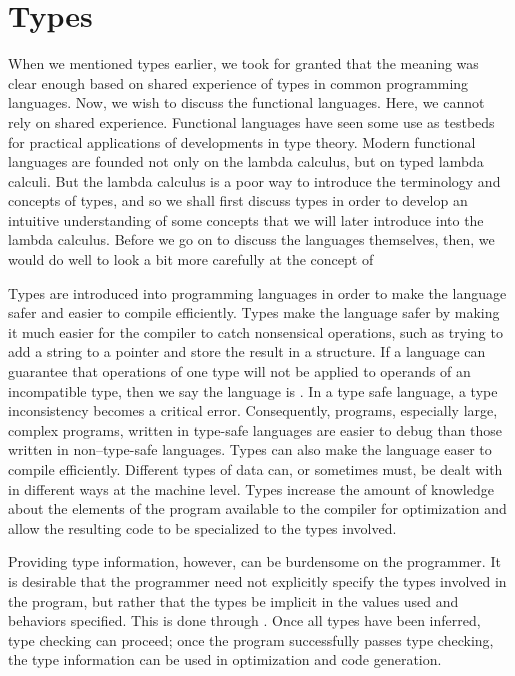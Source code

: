 \section{Types}
When we mentioned types earlier, we took for granted that the meaning was clear enough based on shared experience of types in common programming languages. Now, we wish to discuss the functional languages. Here, we cannot rely on shared experience. Functional languages have seen some use as testbeds for practical applications of developments in type theory. Modern functional languages are founded not only on the lambda calculus, but on typed lambda calculi. But the lambda calculus is a poor way to introduce the terminology and concepts of types, and so we shall first discuss types in order to develop an intuitive understanding of some concepts that we will later introduce into the lambda calculus. Before we go on to discuss the languages themselves, then, we would do well to look a bit more carefully at the concept of 

Types are introduced into programming languages in order to make the language safer and easier to compile efficiently. Types make the language safer by making it much easier for the compiler to catch nonsensical operations, such as trying to add a string to a pointer and store the result in a structure. If a language can guarantee that operations of one type will not be applied to operands of an incompatible type, then we say the language is . In a type safe language, a type inconsistency becomes a critical error. Consequently, programs, especially large, complex programs, written in type-safe languages are easier to debug than those written in non--type-safe languages. Types can also make the language easer to compile efficiently. Different types of data can, or sometimes must, be dealt with in different ways at the machine level. Types increase the amount of knowledge about the elements of the program available to the compiler for optimization and allow the resulting code to be specialized to the types involved.

Providing type information, however, can be burdensome on the programmer. It is desirable that the programmer need not explicitly specify the types involved in the program, but rather that the types be implicit in the values used and behaviors specified. This is done through . Once all types have been inferred, type checking can proceed; once the program successfully passes type checking, the type information can be used in optimization and code generation.

